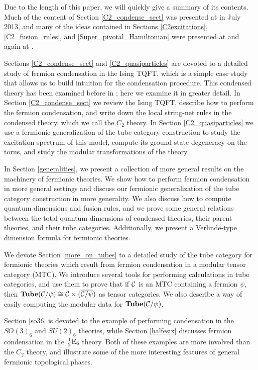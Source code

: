 Due to the length of this paper, we will quickly give a summary of its contents.
Much of the content of Section \ref{C2_condense_sect} was presented at \cite{Walker2013} in July 2013,
and many of the ideas contained in Sections \ref{C2excitations}, \ref{C2_fusion_rules}, and \ref{Super_pivotal_Hamiltonian} were presented at \cite{Walker2014} and again
at \cite{Walker2015}.

Sections \ref{C2_condense_sect} and \ref{C2_quasiparticles} are devoted to a detailed study of 
fermion condensation in the Ising TQFT, which is a simple case study that allows us to build intuition for the condensation procedure.
This condensed theory has been examined before in \cite{bhardwaj2016, kapustin2017}; 
here we examine it in greater detail. 
In Section \ref{C2_condense_sect} we review the Ising TQFT, describe how to perform the 
fermion condensation, and write down the local string-net rules in the condensed theory, 
which we call the $C_2$ theory. 
In Section \ref{C2_quasiparticles} we use a fermionic generalization of the tube category 
construction to study the excitation spectrum of this model, compute its ground state 
degeneracy on the torus, and study the modular transformations %
of the theory. 

In Section \ref{generalities}, we present a collection of more general results
on the machinery of fermionic theories. 
We show how to perform fermion condensation in more general settings
and discuss our fermionic generalization 
of the tube category construction in more generality.
We also discuss how to compute quantum dimensions and fusion rules,
and we prove some general
relations between the total quantum dimensions of condensed theories, their 
parent theories, and their tube categories.
Additionally, we present a Verlinde-type
dimension formula for fermionic theories.

We devote Section \ref{more_on_tubes} to a detailed study of the tube category 
for fermionic theories which result from fermion condensation in a modular tensor category (MTC). 
We introduce several tools for performing calculations in tube categories, 
and use them to prove that if $\mathcal{C}$ is an MTC containing a fermion $\psi$, then
$\textbf{Tube}(\mathcal{C}/\psi)\cong \mathcal{C}\times (\overline{\mathcal{C}/\psi})$ as tensor 
categories. We also describe a way of easily computing the modular data for 
$\textbf{Tube}(\mathcal{C}/\psi)$. 

Section \ref{so36} is devoted to the example of performing condensation in the $SO(3)_6$ 
and $SU(2)_6$ theories, while Section \ref{halfesix} discusses fermion condensation in the $
\frac{1}{2}\text{E}_6$ theory. 
Both of these examples are more involved than the $C_2$ theory, 
and illustrate some of the more interesting features of general fermionic topological phases. 

